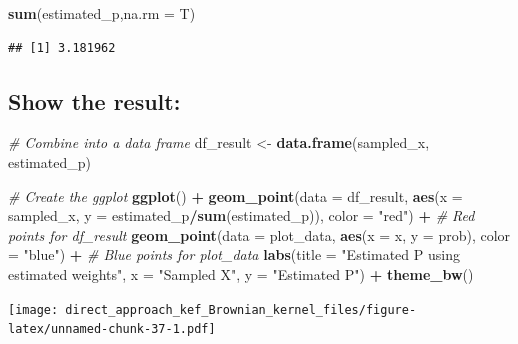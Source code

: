\documentclass[
]{article}
\newenvironment{Shaded}{\begin{snugshade}}{\end{snugshade}}
\newcommand{\AttributeTok}[1]{\textcolor[rgb]{0.13,0.29,0.53}{#1}}
\newcommand{\CommentTok}[1]{\textcolor[rgb]{0.56,0.35,0.01}{\textit{#1}}}
\newcommand{\FunctionTok}[1]{\textcolor[rgb]{0.13,0.29,0.53}{\textbf{#1}}}
\newcommand{\NormalTok}[1]{#1}
\newcommand{\OtherTok}[1]{\textcolor[rgb]{0.56,0.35,0.01}{#1}}
\newcommand{\SpecialCharTok}[1]{\textcolor[rgb]{0.81,0.36,0.00}{\textbf{#1}}}
\newcommand{\StringTok}[1]{\textcolor[rgb]{0.31,0.60,0.02}{#1}}
\begin{document}
\begin{Shaded}
\begin{Highlighting}[]
\FunctionTok{sum}\NormalTok{(estimated\_p,}\AttributeTok{na.rm =}\NormalTok{ T)}
\end{Highlighting}
\end{Shaded}

\begin{verbatim}
## [1] 3.181962
\end{verbatim}

\subsection{Show the result:}\label{show-the-result}

\begin{Shaded}
\begin{Highlighting}[]
\CommentTok{\# Combine into a data frame}
\NormalTok{df\_result }\OtherTok{\textless{}{-}} \FunctionTok{data.frame}\NormalTok{(sampled\_x, estimated\_p)}


\CommentTok{\# Create the ggplot}
\FunctionTok{ggplot}\NormalTok{() }\SpecialCharTok{+}
  \FunctionTok{geom\_point}\NormalTok{(}\AttributeTok{data =}\NormalTok{ df\_result, }\FunctionTok{aes}\NormalTok{(}\AttributeTok{x =}\NormalTok{ sampled\_x, }\AttributeTok{y =}\NormalTok{ estimated\_p}\SpecialCharTok{/}\FunctionTok{sum}\NormalTok{(estimated\_p)), }\AttributeTok{color =} \StringTok{"red"}\NormalTok{) }\SpecialCharTok{+}      \CommentTok{\# Red points for df\_result}
  \FunctionTok{geom\_point}\NormalTok{(}\AttributeTok{data =}\NormalTok{ plot\_data, }\FunctionTok{aes}\NormalTok{(}\AttributeTok{x =}\NormalTok{ x, }\AttributeTok{y =}\NormalTok{ prob), }\AttributeTok{color =} \StringTok{"blue"}\NormalTok{) }\SpecialCharTok{+}                    \CommentTok{\# Blue points for plot\_data}
  \FunctionTok{labs}\NormalTok{(}\AttributeTok{title =} \StringTok{"Estimated P using estimated weights"}\NormalTok{,}
       \AttributeTok{x =} \StringTok{"Sampled X"}\NormalTok{, }\AttributeTok{y =} \StringTok{"Estimated P"}\NormalTok{) }\SpecialCharTok{+}
  \FunctionTok{theme\_bw}\NormalTok{()}
\end{Highlighting}
\end{Shaded}

\texttt{[image: direct\_approach\_kef\_Brownian\_kernel\_files/figure-latex/unnamed-chunk-37-1.pdf]}
\end{document}
